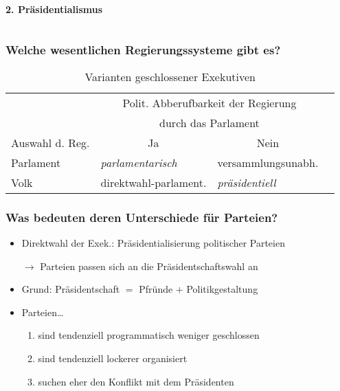 \documentclass{beamer}
\begin{document}
\begin{frame}
\begin{columns}
\begin{column}{.5\textwidth}
\begin{block}{\textbf{2. Präsidentialismus}}
\end{block}
\end{column}
\end{columns}
\end{frame}

\begin{frame}
\frametitle{Welche wesentlichen Regierungssysteme gibt es?}
\begin{table}
  \centering
  \caption{Varianten geschlossener Exekutiven}
  \begin{tabular}{*{4}{l}}
    \toprule
     ~ & \multicolumn{2}{c}{Polit. Abberufbarkeit der Regierung} \\
     ~ & \multicolumn{2}{c}{durch das Parlament} \\
    Auswahl d. Reg. & \multicolumn{1}{c}{Ja} & \multicolumn{1}{c}{Nein} \\
    \cmidrule{2-3}
    Parlament & \textit{parlamentarisch} & versammlungsunabh.\\
    Volk & direktwahl-parlament. & \textit{präsidentiell}\\
    \bottomrule
  \end{tabular}
\end{table}
\end{frame}

\begin{frame}
\frametitle{Was bedeuten deren Unterschiede für Parteien?}
\begin{itemize}
  \item Direktwahl der Exek.: Präsidentialisierung politischer Parteien
  \item [$\rightarrow$] Parteien passen sich an die Präsidentschaftswahl an
  \item Grund: Präsidentschaft $=$ Pfründe $+$ Politikgestaltung
  \item Parteien\dots
  \begin{enumerate}
    \item sind tendenziell programmatisch weniger geschlossen
    \item sind tendenziell lockerer organisiert
    \item suchen eher den Konflikt mit dem Präsidenten
  \end{enumerate}
\end{itemize}
\end{frame}
\end{document}
